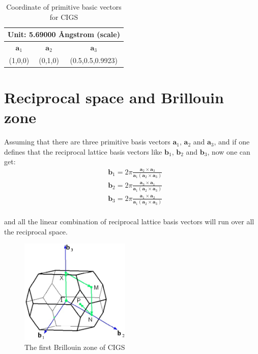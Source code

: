 \documentclass[a4paper, 12pt, titlepage,oneside,drop]{kthesis}
\begin{document}
\begin{table}
\begin{center}
\begin{tabular}{|c|c|c|}
  \hline
  \multicolumn{3}{|c|}{Unit: 5.69000 {\AA}ngstrom (scale)} \\
  \hline
  $\textbf{a}_1$ & $\textbf{a}_2$ & $\textbf{a}_3$ \\ \hline
   (1,0,0) & (0,1,0) & (0.5,0.5,0.9923)   \\ 
  \hline
\end{tabular}
\caption{Coordinate of primitive basic vectors for CIGS}
\end{center}
\end{table}

\section{Reciprocal space and Brillouin zone}
\noindent Assuming that there are three primitive basis vectors  $\textbf{a}_{1}$, $\textbf{a}_{2}$ and  $\textbf{a}_{3}$, and if one defines that the reciprocal lattice basis vectors
like  $\textbf{b}_{1}$, $\textbf{b}_{2}$ and  $\textbf{b}_{3}$, now one can get:
\begin{equation}\begin{split}
& \textbf{b}_1 = 2 \pi \frac{\textbf{a}_2 \times \textbf{a}_3}{\textbf{a}_1 (\textbf{a}_2 \times \textbf{a}_3)} \\
& \textbf{b}_2 = 2 \pi \frac{\textbf{a}_3 \times \textbf{a}_1}{\textbf{a}_1 (\textbf{a}_2 \times \textbf{a}_3)} \\
& \textbf{b}_3 = 2 \pi \frac{\textbf{a}_1 \times \textbf{a}_2}{\textbf{a}_1 (\textbf{a}_2 \times \textbf{a}_3)} \\
\end{split}\end{equation}

\noindent and all the linear combination of reciprocal lattice basis vectors will run over all the reciprocal space.

\begin{figure}[h]
\begin{center}
\includegraphics[height=50mm]{bz.eps}
\caption{The first Brillouin zone of CIGS}
\label{bz}
\end{center}
\end{figure}
\end{document}
